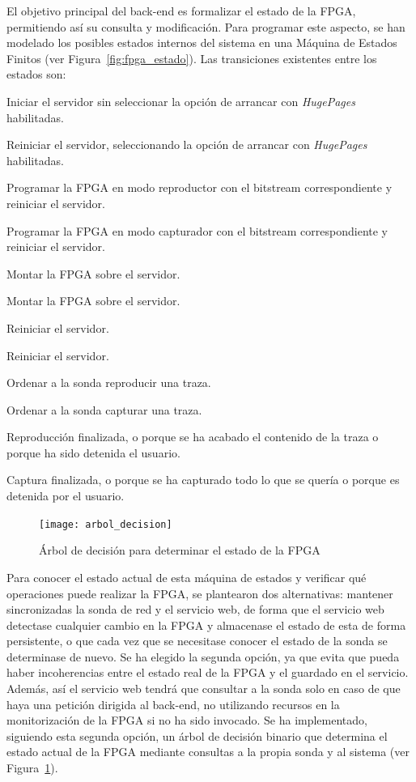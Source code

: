 El objetivo principal del \gls{back-end} es formalizar el estado de la \gls{FPGA}, permitiendo así su consulta y modificación.
Para programar este aspecto, se han modelado los posibles estados internos del sistema en una Máquina de Estados Finitos (ver Figura~\ref{fig:fpga_estado}).
Las transiciones existentes entre los estados son:
\begin{enumerate}[label={\bfseries [\arabic*]}]
  \item Iniciar el servidor sin seleccionar la opción de arrancar con \textit{HugePages} habilitadas.
  \item Reiniciar el servidor, seleccionando la opción de arrancar con \textit{HugePages} habilitadas.
  \item Programar la \gls{FPGA} en modo reproductor con el \gls{bitstream} correspondiente y reiniciar el servidor.
  \item Programar la \gls{FPGA} en modo capturador con el \gls{bitstream} correspondiente y reiniciar el servidor.
  \item Montar la \gls{FPGA} sobre el servidor.
  \item Montar la \gls{FPGA} sobre el servidor.
  \item Reiniciar el servidor.
  \item Reiniciar el servidor.
  \item Ordenar a la sonda reproducir una \gls{traza}.
  \item Ordenar a la sonda capturar una \gls{traza}.
  \item Reproducción finalizada, o porque se ha acabado el contenido de la \gls{traza} o porque ha sido detenida el usuario.
  \item Captura finalizada, o porque se ha capturado todo lo que se quería o porque es detenida por el usuario.
\end{enumerate}

\begin{figure}[!htp]
  \centering
  \texttt{[image: arbol\_decision]}
  \caption{Árbol de decisión para determinar el estado de la \gls{FPGA}}
  \label{fig:arbol_decision}
\end{figure}

Para conocer el estado actual de esta máquina de estados y verificar qué operaciones puede realizar la \gls{FPGA}, se plantearon dos alternativas: mantener sincronizadas la sonda de red y el servicio web, de forma que el servicio web detectase cualquier cambio en la \gls{FPGA} y almacenase el estado de esta de forma persistente, o que cada vez que se necesitase conocer el estado de la sonda se determinase de nuevo.
Se ha elegido la segunda opción, ya que evita que pueda haber incoherencias entre el estado real de la \gls{FPGA} y el guardado en el servicio.
Además, así el servicio web tendrá que consultar a la sonda solo en caso de que haya una petición dirigida al \gls{back-end}, no utilizando recursos en la monitorización de la \gls{FPGA} si no ha sido invocado.
Se ha implementado, siguiendo esta segunda opción, un árbol de decisión binario que determina el estado actual de la \gls{FPGA} mediante consultas a la propia sonda y al sistema (ver Figura~\ref{fig:arbol_decision}).

